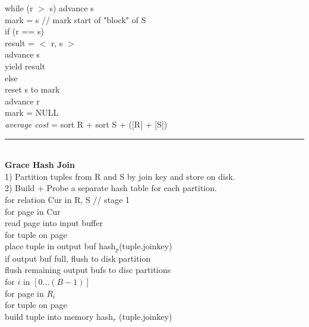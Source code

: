 \documentclass[10pt,landscape]{article}
\newcommand{\ruler}{\\\rule{\columnwidth}{0.25pt}\\}
\begin{document}
\begin{multicols*}{3}
\-\hspace{0.5cm} while (r $>$ s) advance s \\
\-\hspace{0.5cm} mark = s // mark start of "block" of S \\
if (r == s) \\
\-\hspace{0.5cm} result = $<$ r, s $>$\\
\-\hspace{0.5cm} advance s\\
\-\hspace{0.5cm} yield result\\
else\\
\-\hspace{0.5cm} reset s to mark\\
\-\hspace{0.5cm} advance r\\
\-\hspace{0.5cm} mark = NULL\\
\textit{average cost} = sort R + sort S + ($[$R$]$ + $[$S$]$)
\ruler
\textbf{Grace Hash Join}\\
1) Partition tuples from R and S by join key and store on disk.\\
2) Build + Probe a separate hash table for each partition.\\
for relation Cur in {R, S} // stage 1\\ 
\-\hspace{0.5cm} for page in Cur\\
\-\hspace{1.0cm} read page into input buffer\\
\-\hspace{1.0cm} for tuple on page\\
\-\hspace{1.5cm} place tuple in output buf hash$_p$(tuple.joinkey)\\
\-\hspace{1.5cm} if output buf full, flush to disk partition\\
\-\hspace{0.5cm} flush remaining output bufs to disc partitions\\
for $i$ in $[0...(B-1)]$\\
\-\hspace{0.5cm} for page in $R_i$\\
\-\hspace{1.0cm} for tuple on page\\
\-\hspace{1.5cm} build tuple into memory hash$_r$ (tuple.joinkey)\\

\end{multicols*}
\end{document}
